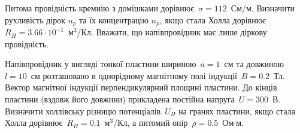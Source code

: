 \begin{problem}%
Питома провідність кремнію з домішками дорівнює~$\sigma = 112$~См/м.
Визначити рухливість дірок $u_p$ та їх концентрацію $n_p$, якщо стала Холла дорівнює~$R_H = 3.66\cdot10^{-1}$~м$^3$/Кл.
Вважати, що напівпровідник має лише діркову провідність.
\end{problem}

\begin{problem}%
Напівпровідник у вигляді тонкої пластини шириною~$a = 1$~см та довжиною~$l=10$~см розташовано
в однорідному магнітному полі індукції~$B = 0.2$~Тл.
Вектор магнітної індукції перпендикулярний площині пластини.
До кінців пластини (вздовж його довжини) прикладена постійна напруга~$U = 300$~В.
Визначити холлівську різницю потенціалів~$U_H$ на гранях пластини,
якщо стала Холла дорівнює~$R_H = 0.1$~м$^3$/Кл, а питомий опір~$\rho = 0.5$~Ом$\cdot$м.
\end{problem}






